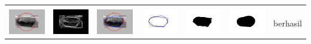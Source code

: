 \begin{table}[H]
\begin{tabular}{|m{0.7in}|m{0.7in}|m{0.7in}|m{0.7in}|m{0.7in}|m{0.7in}|m{0.7in}|}
		&  &  & & & &  \\
		\includegraphics[width=0.7in]{dataset/dataset_3/luka_hitam/ready/22_interp_init.jpg}&
		\includegraphics[width=0.7in]{dataset/dataset_3/luka_hitam/ready/22_interp_ext.jpg}&
		\includegraphics[width=0.7in]{dataset/dataset_3/luka_hitam/ready/22_interp_result.jpg}&
		\includegraphics[width=0.7in]{dataset/dataset_3/luka_hitam/ready/22_gt_r.jpg}&
		\includegraphics[width=0.7in]{dataset/dataset_3/luka_hitam/ready/22_r.jpg}&
		\includegraphics[width=0.7in]{dataset/dataset_3/luka_hitam/ready/22_interp_r.jpg}&
		berhasil\\
		\hline
		

\end{tabular}
\end{table}
